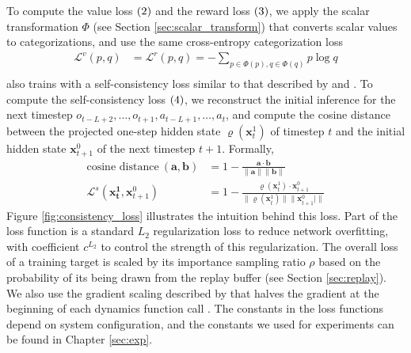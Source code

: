 To compute the value loss $(2)$ and the reward loss $(3)$, we apply the scalar transformation $\Phi$ (see Section \ref{sec:scalar_transform}) that converts scalar values to categorizations,
and use the same cross-entropy categorization loss
\begin{align*}
    \mathcal{L}^v(p, q)  & = \mathcal{L}^r(p, q) = - \sum_{p \in \Phi(p), q \in \Phi(q)} p \log{q}  \\
\end{align*}
\moozi also trains with a self-consistency loss similar to that described by \citeauthor{MasteringAtariGames_Ye.Liu.ea_2021} and \citeauthor{VisualizingMuZeroModels_deVries.Voskuil.ea_2021} \cite{MasteringAtariGames_Ye.Liu.ea_2021,VisualizingMuZeroModels_deVries.Voskuil.ea_2021}.
To compute the self-consistency loss $(4)$, we reconstruct the initial inference for the next timestep \(o_{t-L+2}, \dots, o_{t+1}, a_{t-L+1}, \dots, a_{t}\), and compute the cosine distance between the projected one-step hidden state $\varrho(\mathbf{x}^1_t)$ of timestep $t$ and the initial hidden state $\mathbf{x}^0_{t+1}$ of the next timestep $t+1$.
Formally,
\begin{align*}
    \text{cosine distance} ~ (\mathbf{a}, \mathbf{b})
                                                       & = 1 - \frac{\mathbf{a} \cdot \mathbf{b}}{\|\mathbf{a}\|\|\mathbf{b}\|}  \\
    \mathcal{L}^s(\mathbf{x^1_t}, \mathbf{x}^0_{t+1})  & = 1 - \frac{\varrho(\mathbf{x}^1_t) \cdot \mathbf{x}^0_{t+1}}{\|\varrho(\mathbf{x}^1_t)\| \| \mathbf{x}^0_{t+1}|\|}
\end{align*}
Figure \ref{fig:consistency_loss} illustrates the intuition behind this loss.
Part  of the loss function is a standard $L_2$ regularization loss to reduce network overfitting,
with coefficient $c^{L_2}$ to control the strength of this regularization.
The overall loss of a training target is scaled by its importance sampling ratio $\rho$ based on the probability of its being drawn from the replay buffer (see Section \ref{sec:replay}).
We also use the gradient scaling described by \citeauthor{MasteringAtariGo_Schrittwieser.Antonoglou.ea_2020}
that halves the gradient at the beginning of each dynamics function call \cite{MasteringAtariGo_Schrittwieser.Antonoglou.ea_2020}.
The constants in the loss functions depend on system configuration, and the constants we used for experiments can be found in Chapter \ref{sec:exp}.


